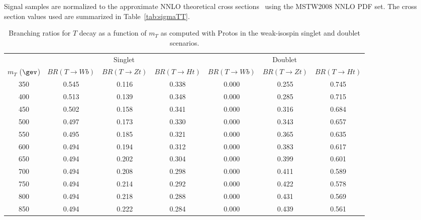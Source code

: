 Signal samples are normalized to the approximate NNLO theoretical cross sections~\cite{ttbarxs} using the {\sc MSTW2008} NNLO PDF set.
The cross section values used are summarized in Table~\ref{tab:sigmaTT}.



\begin{table}[h!]
\begin{center}
\begin{tabular}{c c c c c c c}
\hline
\hline
 & \multicolumn{3}{c}{Singlet} &  \multicolumn{3}{c}{Doublet} \\
 $m_{T}$ ($\gev$) & $BR(T \to Wb)$ & $BR(T \to Zt)$ & $BR(T \to Ht)$ & $BR(T \to Wb)$ & $BR(T \to Zt)$ & $BR(T \to Ht)$\\
\hline
350 	&  0.545 	&  0.116 	&  0.338	&  0.000 	&  0.255 	&  0.745 	\\ 
400 	&  0.513 	&  0.139 	&  0.348	&  0.000 	&  0.285 	&  0.715 	\\
450 	&  0.502 	&  0.158 	&  0.341	&  0.000 	&  0.316 	&  0.684 	\\ 
500 	&  0.497 	&  0.173 	&  0.330	&  0.000 	&  0.343 	&  0.657 	\\
550 	&  0.495 	&  0.185 	&  0.321	&  0.000 	&  0.365 	&  0.635 	\\
600 	&  0.494 	&  0.194 	&  0.312	&  0.000 	&  0.383 	&  0.617 	\\ 	
650 	&  0.494 	&  0.202 	&  0.304	&  0.000 	&  0.399 	&  0.601 	\\ 
700 	&  0.494 	&  0.208 	&  0.298	&  0.000 	&  0.411 	&  0.589 	\\ 
750 	&  0.494 	&  0.214 	&  0.292	&  0.000 	&  0.422 	&  0.578 	\\ 
800 	&  0.494 	&  0.218 	&  0.288	&  0.000 	&  0.431 	&  0.569 	\\
850 	&  0.494 	&  0.222 	&  0.284	&  0.000 	&  0.439 	&  0.561 	\\ 
\hline
\hline
\end{tabular}
\caption{\label{tab:BRT} Branching ratios for $T$ decay as a function
of $m_{T}$ as computed with {\sc Protos} in the weak-isospin singlet and doublet scenarios.}
\end{center}
\end{table}
